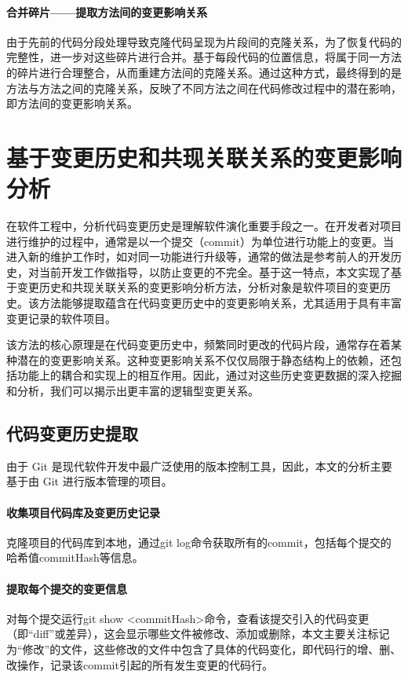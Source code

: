 \paragraph{合并碎片——提取方法间的变更影响关系}

由于先前的代码分段处理导致克隆代码呈现为片段间的克隆关系，为了恢复代码的完整性，进一步对这些碎片进行合并。基于每段代码的位置信息，将属于同一方法的碎片进行合理整合，从而重建方法间的克隆关系。通过这种方式，最终得到的是方法与方法之间的克隆关系，反映了不同方法之间在代码修改过程中的潜在影响，即方法间的变更影响关系。

\section{基于变更历史和共现关联关系的变更影响分析}

在软件工程中，分析代码变更历史是理解软件演化重要手段之一。在开发者对项目进行维护的过程中，通常是以一个提交（commit）为单位进行功能上的变更。当进入新的维护工作时，如对同一功能进行升级等，通常的做法是参考前人的开发历史，对当前开发工作做指导，以防止变更的不完全。基于这一特点，本文实现了基于变更历史和共现关联关系的变更影响分析方法，分析对象是软件项目的变更历史。该方法能够提取蕴含在代码变更历史中的变更影响关系，尤其适用于具有丰富变更记录的软件项目。

该方法的核心原理是在代码变更历史中，频繁同时更改的代码片段，通常存在着某种潜在的变更影响关系。这种变更影响关系不仅仅局限于静态结构上的依赖，还包括功能上的耦合和实现上的相互作用。因此，通过对这些历史变更数据的深入挖掘和分析，我们可以揭示出更丰富的逻辑型变更关系。

\subsection{代码变更历史提取}

由于 Git 是现代软件开发中最广泛使用的版本控制工具，因此，本文的分析主要基于由 Git 进行版本管理的项目。

\paragraph{收集项目代码库及变更历史记录}克隆项目的代码库到本地，通过git log命令获取所有的commit，包括每个提交的哈希值commitHash等信息。

\paragraph{提取每个提交的变更信息} 对每个提交运行git show <commitHash>命令，查看该提交引入的代码变更（即“diff”或差异），这会显示哪些文件被修改、添加或删除，本文主要关注标记为“修改”的文件，这些修改的文件中包含了具体的代码变化，即代码行的增、删、改操作，记录该commit引起的所有发生变更的代码行。


